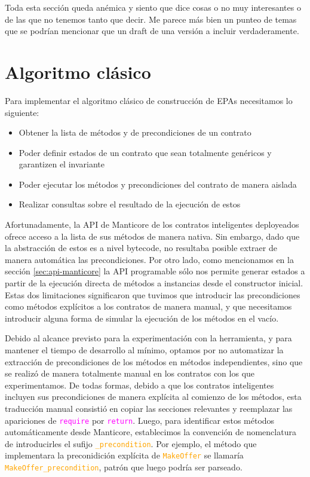 Toda esta sección queda anémica y siento que dice cosas o no muy interesantes o de las que no tenemos tanto que decir.
Me parece más bien un punteo de temas que se podrían mencionar que un draft de una versión a incluir verdaderamente.

\section{Algoritmo clásico}
Para implementar el algoritmo clásico de construcción de EPAs necesitamos lo siguiente:
\begin{itemize}
    \item Obtener la lista de métodos y de precondiciones de un contrato
    \item Poder definir estados de un contrato que sean totalmente genéricos y garantizen el invariante
    \item Poder ejecutar los métodos y precondiciones del contrato de manera aislada
    \item Realizar consultas sobre el resultado de la ejecución de estos
\end{itemize}
Afortunadamente, la API de Manticore de los contratos inteligentes deployeados ofrece acceso a la lista de sus métodos de manera nativa.
Sin embargo, dado que la abstracción de estos es a nivel bytecode, no resultaba posible extraer de manera automática las precondiciones.
Por otro lado, como mencionamos en la sección \ref{sec:api-manticore} la API programable sólo nos permite generar estados a partir de la ejecución directa de métodos a instancias desde el constructor inicial.
Estas dos limitaciones significaron que tuvimos que introducir las precondiciones como métodos explícitos a los contratos de manera manual, y que necesitamos introducir alguna forma de simular la ejecución de los métodos en el vacío.

Debido al alcance previsto para la experimentación con la herramienta, y para mantener el tiempo de desarrollo al mínimo, optamos por no automatizar la extracción de precondiciones de los métodos en métodos independientes, sino que se realizó de manera totalmente manual en los contratos con los que experimentamos.
De todas formas, debido a que los contratos inteligentes incluyen sus precondiciones de manera explícita al comienzo de los métodos, esta traducción manual consistió en copiar las secciones relevantes y reemplazar las apariciones de \textcolor{magenta}{\texttt{require}} por \textcolor{magenta}{\texttt{return}}.
Luego, para identificar estos métodos automáticamente desde Manticore, establecimos la convención de nomenclatura de introducirles el sufijo \textcolor{orange}{\texttt{\_precondition}}.
Por ejemplo, el método que implementara la preconidición explícita de \textcolor{orange}{\texttt{MakeOffer}} se llamaría \textcolor{orange}{\texttt{MakeOffer\_precondition}}, patrón que luego podría ser parseado.

